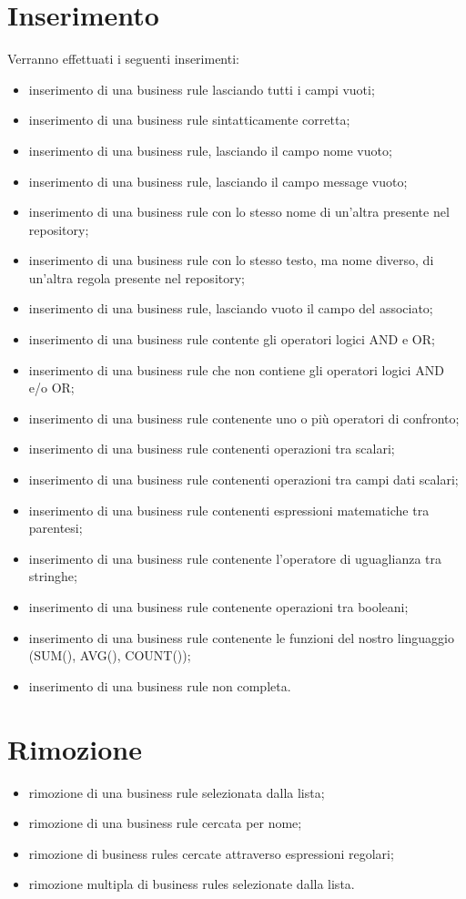 \chapter{Inserimento}
Verranno effettuati i seguenti inserimenti:
\begin{itemize}
\item inserimento di una business rule lasciando tutti i campi vuoti;
\item inserimento di una business rule sintatticamente corretta;
\item inserimento di una business rule, lasciando il campo nome vuoto;
\item inserimento di una business rule, lasciando il campo message vuoto;
\item inserimento di una business rule con lo stesso nome di un'altra presente nel repository;
\item inserimento di una business rule con lo stesso testo, ma nome diverso, di un'altra regola presente nel repository;
\item inserimento di una business rule, lasciando vuoto il campo del \bo associato;
\item inserimento di una business rule contente gli operatori logici AND e OR;
\item inserimento di una business rule che non contiene gli operatori logici AND e/o OR;
\item inserimento di una business rule contenente uno o pi\`u operatori di confronto;
\item inserimento di una business rule contenenti operazioni tra scalari;
\item inserimento di una business rule contenenti operazioni tra campi dati scalari;
\item inserimento di una business rule contenenti espressioni matematiche tra parentesi;
\item inserimento di una business rule contenente l'operatore di uguaglianza tra stringhe;
\item inserimento di una business rule contenente operazioni tra booleani;
\item inserimento di una business rule contenente le funzioni del nostro linguaggio (SUM(), AVG(), COUNT());
\item inserimento di una business rule non completa.
\end{itemize}
\chapter{Rimozione}
\begin{itemize}
\item rimozione di una business rule selezionata dalla lista;
\item rimozione di una business rule cercata per nome;
\item rimozione di business rules cercate attraverso espressioni regolari;
\item rimozione multipla di business rules selezionate dalla lista.
\end{itemize}
